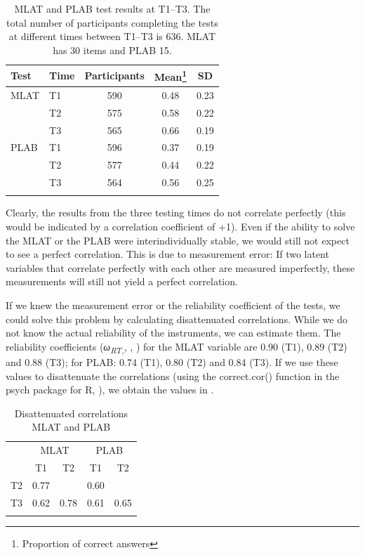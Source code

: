 \documentclass[output=paper]{langsci/langscibook}
\begin{document}
\begin{table}
\caption{\label{tab:10:1}MLAT and PLAB test results at T1--T3. The total number of participants completing the tests at different times between T1--T3 is 636. MLAT has 30 items and PLAB 15.}
\begin{tabular}{ll ccc}
\lsptoprule
{Test} & {Time} & {Participants} & {Mean\footnote{Proportion of correct answers}} & {SD}\\\midrule
{MLAT} & {T1} & {590} & {0.48} & {0.23}\\
       & {T2} & {575} & {0.58} & {0.22}\\
       & {T3} & {565} & {0.66} & {0.19}\\
{PLAB} & {T1} & {596} & {0.37} & {0.19}\\
       & {T2} & {577} & {0.44} & {0.22}\\
       & {T3} & {564} & {0.56} & {0.25}\\
\lspbottomrule
\end{tabular}
\end{table}

Clearly, the results from the three testing times do not correlate perfectly (this would be indicated by a correlation coefficient of +1). Even if the ability to solve the MLAT or the PLAB were interindividually stable, we would still not expect to see a perfect correlation. This is due to measurement error: If two latent variables that correlate perfectly with each other are measured imperfectly, these measurements will still not yield a perfect correlation. 

If we knew the measurement error or the reliability coefficient of the tests, we could solve this problem by calculating disattenuated correlations. While we do not know the actual reliability of the instruments, we can estimate them. The reliability coefficients (\textit{ω\textsubscript{RT,}}, \citealt{McNeish2018}, \citealt{Revelle2019}) for the MLAT variable are 0.90 (T1), 0.89 (T2) and 0.88 (T3); for PLAB: 0.74 (T1), 0.80 (T2) and 0.84 (T3). If we use these values to disattenuate the correlations (using the correct.cor() function in the psych package for R, \citealt{Revelle2018}), we obtain the values in .



\begin{table}
\caption{\label{tab:10:2}\label{tab:10:3}Disattenuated correlations MLAT and PLAB}
\begin{tabular}{lcc cc}
\lsptoprule
     & \multicolumn{2}{c}{MLAT} & \multicolumn{2}{c}{PLAB}\\\cmidrule(lr){2-3}\cmidrule(lr){4-5}
     & {T1} & {T2}     & {T1} & {T2}\\\midrule
{T2} & {0.77} &        & {0.60} & \\
{T3} & {0.62} & {0.78} & {0.61} & {0.65}\\
\lspbottomrule
\end{tabular}
\end{table}
\end{document}
